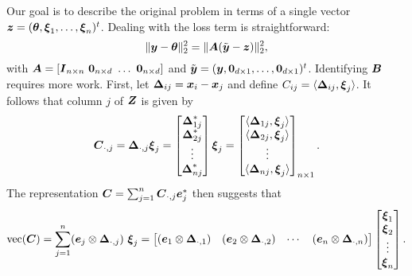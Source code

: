 \documentclass{article}
\begin{document}
Our goal is to describe the original problem in terms of a single vector \(\boldsymbol{z} = (\boldsymbol{\theta}, \boldsymbol{\xi}_{1}, \ldots, \boldsymbol{\xi}_{n})^{t}\).
Dealing with the loss term is straightforward:
\begin{equation*}
    \|\boldsymbol{y} - \boldsymbol{\theta}\|_{2}^{2}
    =
    \|\boldsymbol{A} (\tilde{\boldsymbol{y}} - \boldsymbol{z})\|_{2}^{2},
\end{equation*}
with \(\boldsymbol{A} = [\boldsymbol{I}_{n \times n}~\boldsymbol{0}_{n \times d}~\ldots ~\boldsymbol{0}_{n \times d}]\) and \(\tilde{\boldsymbol{y}} = (\boldsymbol{y}, \boldsymbol{0}_{d \times 1}, \ldots, \boldsymbol{0}_{d \times 1})^{t}\).
Identifying \(\boldsymbol{B}\) requires more work.
First, let \(\boldsymbol{\Delta}_{ij} = \boldsymbol{x}_{i} - \boldsymbol{x}_{j}\) and define \(C_{ij} = \langle{\boldsymbol{\Delta}_{ij}, \boldsymbol{\xi}_{j}}\rangle\).
It follows that column \(j\) of \(\boldsymbol{Z}\) is given by
\begin{equation*}
    \boldsymbol{C}_{\cdot, j}
    =
    \boldsymbol{\Delta}_{\cdot,j} \boldsymbol{\xi}_{j}
    =
    \begin{bmatrix}
        \boldsymbol{\Delta}_{1j}^{\ast} \\
        \boldsymbol{\Delta}_{2j}^{\ast} \\
        \vdots \\
        \boldsymbol{\Delta}_{nj}^{\ast}
    \end{bmatrix}
    \boldsymbol{\xi}_{j}
    =
    \begin{bmatrix}
        \langle\boldsymbol{\Delta}_{1j}, \boldsymbol{\xi}_{j}\rangle \\
        \langle\boldsymbol{\Delta}_{2j}, \boldsymbol{\xi}_{j}\rangle \\
        \vdots \\
        \langle\boldsymbol{\Delta}_{nj}, \boldsymbol{\xi}_{j}\rangle
    \end{bmatrix}_{n \times 1}.
\end{equation*}
The representation \(\boldsymbol{C} = \sum_{j=1}^{n} \boldsymbol{C}_{\cdot, j} \boldsymbol{e}_{j}^{\ast}\) then suggests that
\begin{equation*}
    \mathop{\rm vec}\nolimits(\boldsymbol{C})
    =
    \sum_{j=1}^{n} (\boldsymbol{e}_{j} \otimes \boldsymbol{\Delta}_{\cdot,j})~\boldsymbol{\xi}_{j} 
    =
    \begin{bmatrix}
        (\boldsymbol{e}_{1} \otimes \boldsymbol{\Delta}_{\cdot,1})
        & (\boldsymbol{e}_{2} \otimes \boldsymbol{\Delta}_{\cdot,2})
        & \cdots
        & (\boldsymbol{e}_{n} \otimes \boldsymbol{\Delta}_{\cdot,n})
    \end{bmatrix}
    \begin{bmatrix}
        \boldsymbol{\xi}_{1} \\
        \boldsymbol{\xi}_{2} \\
        \vdots \\
        \boldsymbol{\xi}_{n}
    \end{bmatrix}.
\end{equation*}
\end{document}
